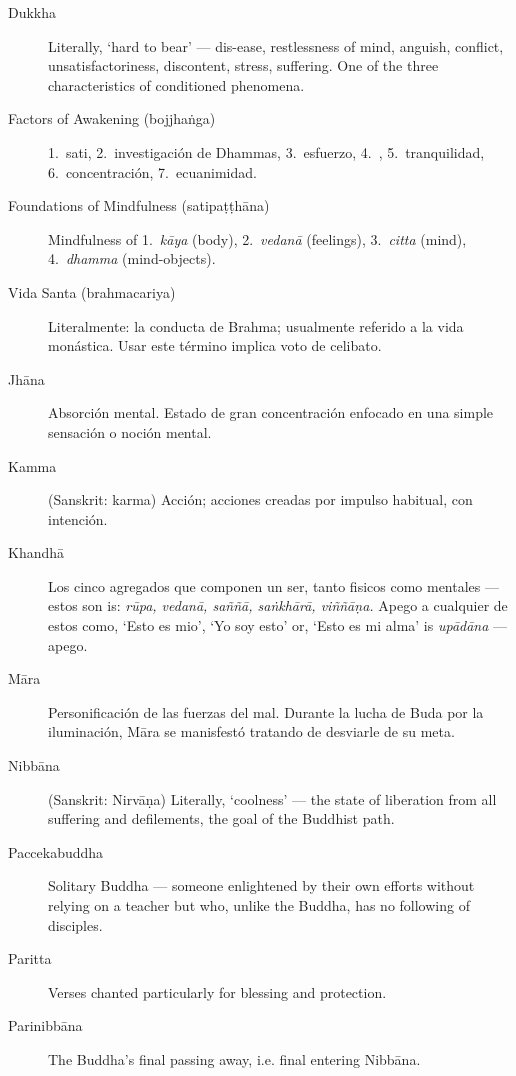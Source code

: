 \begin{description}
\item[Dukkha] Literally, ‘hard to bear’ --- dis-ease, restlessness of
  mind, anguish, conflict, unsatisfactoriness, discontent, stress,
  suffering. One of the three characteristics of conditioned phenomena.

\item[Factors of Awakening (bojjhaṅga)] 1.~sati, 2.~investigación de Dhammas, 3.~esfuerzo, 4.~, 5.~tranquilidad, 6.~concentración, 7.~ecuanimidad.

\item[Foundations of Mindfulness (satipaṭṭhāna)] Mindfulness of 1.~\emph{kāya} (body), 2.~\emph{vedanā} (feelings), 3.~\emph{citta} (mind),
4.~\emph{dhamma} (mind-objects).

\item[Vida Santa (brahmacariya)] Literalmente: la conducta de Brahma; usualmente referido a la vida monástica. Usar este término implica voto de celibato.

\item[Jhāna] Absorción mental. Estado de gran concentración enfocado en una simple sensación o noción mental.

\item[Kamma] (Sanskrit: karma) Acción; acciones creadas por impulso habitual, con intención.

\item[Khandhā] Los cinco agregados que componen un ser, tanto fisicos como mentales ---
  estos son is: \emph{rūpa, vedanā, saññā, saṅkhārā, viññāṇa.} Apego a cualquier de estos como, ‘Esto es mio’, ‘Yo soy esto’ or, ‘Esto es mi alma’ is
  \emph{upādāna} --- apego.

\item[Māra] Personificación de las fuerzas del mal. Durante la lucha de Buda por la iluminación, Māra se manisfestó tratando de desviarle de su meta.

\item[Nibbāna] (Sanskrit: Nirvāṇa) Literally, ‘coolness’ --- the state of
  liberation from all suffering and defilements, the goal of the
  Buddhist path.

\item[Paccekabuddha] Solitary Buddha --- someone enlightened by their own
  efforts without relying on a teacher but who, unlike the Buddha, has
  no following of disciples.

\item[Paritta] Verses chanted particularly for blessing and protection.

\item[Parinibbāna] The Buddha’s final passing away, i.e. final entering
  Nibbāna.


\end{description}
